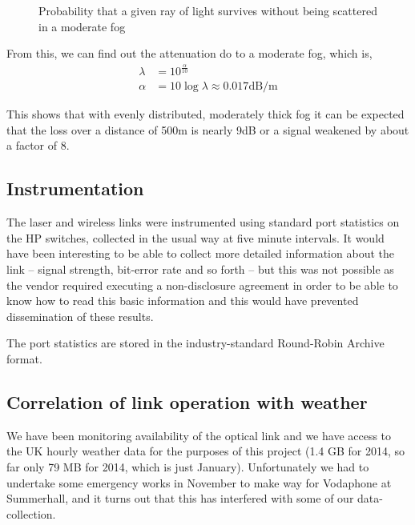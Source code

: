 \begin{figure}[h]
  \centering
  \caption{Probability that a given ray of light survives without
    being scattered in a moderate fog}
  \label{fig:transmission-probability}
\end{figure}

From this, we can find out the attenuation do to a moderate fog, which
is,
\begin{align}
  \lambda &= 10^{\frac{\alpha}{10}}\\
  \alpha &= 10\log\lambda \approx 0.017 \text{dB}/\text{m}
  \label{eq:fog_attenuation}
\end{align}

This shows that with evenly distributed, moderately thick fog it can
be expected that the loss over a distance of 500m is nearly 9dB or a
signal weakened by about a factor of 8.

\clearpage
\subsection{Instrumentation}

The laser and wireless links were instrumented using standard port
statistics on the HP switches, collected in the usual way at five
minute intervals. It would have been interesting to be able to collect
more detailed information about the link -- signal strength, bit-error
rate and so forth -- but this was not possible as the vendor required
executing a non-disclosure agreement in order to be able to know how to
read this basic information and this would have prevented
dissemination of these results.

The port statistics are stored in the industry-standard Round-Robin
Archive format.

\clearpage
\subsection{Correlation of link operation with weather}
\label{sec:weather}

We have been monitoring availability of the optical link and we have
access to the UK hourly weather data for the purposes of this project
(1.4 GB for 2014, so far only 79 MB for 2014, which is just
January). Unfortunately we had to undertake some emergency works in
November to make way for Vodaphone at Summerhall, and it turns out
that this has interfered with some of our data-collection.


